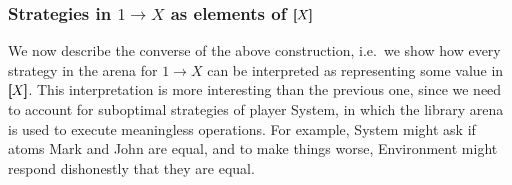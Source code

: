 \subsubsection{Strategies in $1 \to X$ as elements of $[\!\![X]\!\!]$}
\label{sec:strategies-in-1-to-x-as-elements-of-sem-x}
We now describe the converse of the above construction, i.e.~we show how every strategy in the arena for $1 \to X$ can be interpreted as representing some value in $[\!\![X]\!\!]$. 
This interpretation is more interesting than the previous one, since we need to account for suboptimal strategies of player System, in which the library arena is used to execute meaningless operations. For example, System might ask if atoms Mark and John are equal, and to make things worse, Environment might respond dishonestly that they are equal.  



